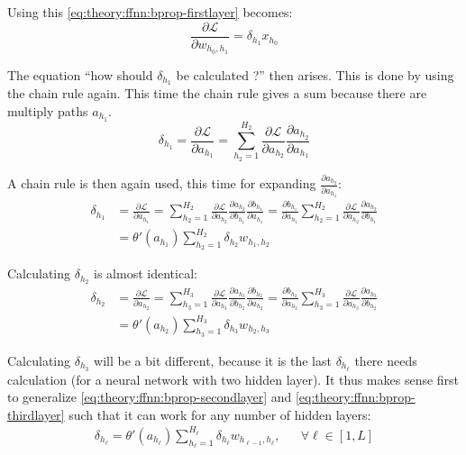 Using this \eqref{eq:theory:ffnn:bprop-firstlayer} becomes:
\begin{equation}
\frac{\partial \mathcal{L}}{\partial w_{h_0, h_1}} = \delta_{h_1} x_{h_0}
\label{eq:theory:ffnn:bprop-w01}
\end{equation}

The equation ``how should $\delta_{h_1}$ be calculated ?'' then arises. This is done by using the chain rule again. This time the chain rule gives a sum because there are multiply paths $a_{h_1}$. 
\begin{equation}
\delta_{h_1} = \frac{\partial \mathcal{L}}{\partial a_{h_1}} = \sum_{h_2=1}^{H_2} \frac{\partial \mathcal{L}}{\partial a_{h_2}} \frac{\partial a_{h_2}}{\partial a_{h_1}}
\end{equation}

A chain rule is then again used, this time for expanding $\frac{\partial a_{h_2}}{\partial a_{h_1}}$:
\begin{equation}
\begin{aligned}
\delta_{h_1}
&= \frac{\partial \mathcal{L}}{\partial a_{h_1}}
= \sum_{h_2=1}^{H_2} \frac{\partial \mathcal{L}}{\partial a_{h_2}} \frac{\partial a_{h_2}}{\partial b_{h_1}} \frac{\partial b_{h_1}}{\partial a_{h_1}}
= \frac{\partial b_{h_1}}{\partial a_{h_1}} \sum_{h_2=1}^{H_2} \frac{\partial \mathcal{L}}{\partial a_{h_2}} \frac{\partial a_{h_2}}{\partial b_{h_1}} \\
&= \theta'(a_{h_1}) \sum_{h_2=1}^{H_2} \delta_{h_2} w_{h_1, h_2}
\end{aligned}
\label{eq:theory:ffnn:bprop-secondlayer}
\end{equation}

Calculating $\delta_{h_2}$ is almost identical:
\begin{equation}
\begin{aligned}
\delta_{h_2}
&= \frac{\partial \mathcal{L}}{\partial a_{h_2}}
= \sum_{h_3=1}^{H_3} \frac{\partial \mathcal{L}}{\partial a_{h_3}} \frac{\partial a_{h_3}}{\partial b_{h_2}} \frac{\partial b_{h_2}}{\partial a_{h_2}}
= \frac{\partial b_{h_2}}{\partial a_{h_2}} \sum_{h_3=1}^{H_3} \frac{\partial \mathcal{L}}{\partial a_{h_3}} \frac{\partial a_{h_3}}{\partial b_{h_2}} \\
&= \theta'(a_{h_2}) \sum_{h_3=1}^{H_3} \delta_{h_3} w_{h_2, h_3}
\end{aligned}
\label{eq:theory:ffnn:bprop-thirdlayer}
\end{equation}

Calculating $\delta_{h_3}$ will be a bit different, because it is the last $\delta_{h_\ell}$ there needs calculation (for a neural network with two hidden layer). It thus makes sense first to generalize \eqref{eq:theory:ffnn:bprop-secondlayer} and \eqref{eq:theory:ffnn:bprop-thirdlayer} such that it can work for any number of hidden layers:
\begin{equation}
\begin{aligned}
\delta_{h_\ell} = \theta'(a_{h_\ell}) \sum_{h_\ell=1}^{H_\ell} \delta_{h_\ell} w_{h_{\ell-1}, h_\ell}, && \forall \ell \in [1, L]
\end{aligned}
\label{eq:theory:ffnn:bprop-genalized}
\end{equation}


